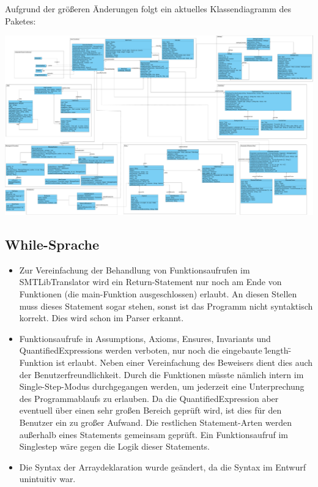 Aufgrund der gr\"{o}\ss eren \"{A}nderungen folgt ein aktuelles Klassendiagramm des Paketes:\\
\begin{landscape}
\includegraphics[width=0.85\paperheight]{images/coregui.pdf}
\end{landscape}
\subsection{While-Sprache}
\begin{itemize}
\item Zur Vereinfachung der Behandlung von Funktionsaufrufen im SMTLibTranslator wird ein Return-Statement nur noch am Ende von Funktionen (die main-Funktion ausgeschlossen) erlaubt.
An diesen Stellen muss dieses Statement sogar stehen, sonst ist das Programm nicht syntaktisch korrekt. Dies wird schon im Parser erkannt.
\item Funktionsaufrufe in Assumptions, Axioms, Ensures, Invariants und QuantifiedExpressions werden verboten, nur noch die eingebaute \"length\"-Funktion ist erlaubt.
Neben einer Vereinfachung des Beweisers dient dies auch der Benutzerfreundlichkeit.
Durch die Funktionen m\"{u}sste n\"{a}mlich intern im Single-Step-Modus durchgegangen werden, um jederzeit eine Unterprechung des Programmablaufs zu erlauben.
Da die QuantifiedExpression aber eventuell \"{u}ber einen sehr gro\ss{}en Bereich gepr\"{u}ft wird, ist dies f\"{u}r den Benutzer ein zu gro\ss{}er Aufwand. Die restlichen Statement-Arten
werden au\ss{}erhalb eines Statements gemeinsam gepr\"{u}ft. Ein Funktionsaufruf im Singlestep w\"{a}re gegen die Logik dieser Statements.
\item Die Syntax der Arraydeklaration wurde ge\"{a}ndert, da die Syntax im Entwurf unintuitiv war.
\end{itemize}
